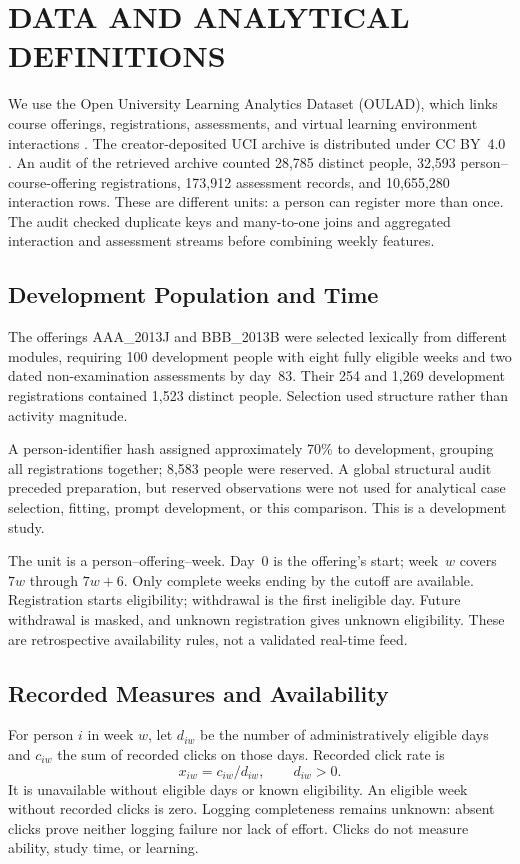 \section{\uppercase{Data and Analytical Definitions}}
\label{sec:data}
\noindent We use the Open University Learning Analytics Dataset (OULAD), which links course offerings, registrations, assessments, and virtual learning environment interactions \cite{oulad}. The creator-deposited UCI archive is distributed under CC BY~4.0 \cite{ouladDataset}. An audit of the retrieved archive counted 28,785 distinct people, 32,593 person--course-offering registrations, 173,912 assessment records, and 10,655,280 interaction rows. These are different units: a person can register more than once. The audit checked duplicate keys and many-to-one joins and aggregated interaction and assessment streams before combining weekly features.\draftassist

\subsection{Development Population and Time}
The offerings AAA\_2013J and BBB\_2013B were selected lexically from different modules, requiring 100 development people with eight fully eligible weeks and two dated non-examination assessments by day~83. Their 254 and 1,269 development registrations contained 1,523 distinct people. Selection used structure rather than activity magnitude.

A person-identifier hash assigned approximately 70\% to development, grouping all registrations together; 8,583 people were reserved. A global structural audit preceded preparation, but reserved observations were not used for analytical case selection, fitting, prompt development, or this comparison. This is a development study.

The unit is a person--offering--week. Day~0 is the offering's start; week~$w$ covers $7w$ through $7w+6$. Only complete weeks ending by the cutoff are available. Registration starts eligibility; withdrawal is the first ineligible day. Future withdrawal is masked, and unknown registration gives unknown eligibility. These are retrospective availability rules, not a validated real-time feed.

\subsection{Recorded Measures and Availability}
For person $i$ in week $w$, let $d_{iw}$ be the number of administratively eligible days and $c_{iw}$ the sum of recorded clicks on those days. Recorded click rate is
\begin{equation}
x_{iw}=c_{iw}/d_{iw},\qquad d_{iw}>0.
\label{eq:rate}
\end{equation}
It is unavailable without eligible days or known eligibility. An eligible week without recorded clicks is zero. Logging completeness remains unknown: absent clicks prove neither logging failure nor lack of effort. Clicks do not measure ability, study time, or learning.

